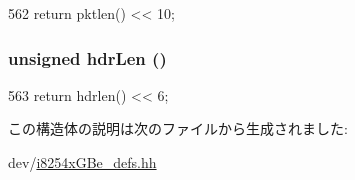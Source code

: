 \begin{DoxyCode}
562 { return pktlen() << 10; }
\end{DoxyCode}
\hypertarget{structiGbReg_1_1Regs_1_1SRRCTL_ae045a09118af243b7abba05e4d4eefbb}{
\subsubsection[{hdrLen}]{\setlength{\rightskip}{0pt plus 5cm}unsigned hdrLen ()}}
\label{structiGbReg_1_1Regs_1_1SRRCTL_ae045a09118af243b7abba05e4d4eefbb}



\begin{DoxyCode}
563 { return hdrlen() << 6; }
\end{DoxyCode}


この構造体の説明は次のファイルから生成されました:\begin{DoxyCompactItemize}
\item 
dev/\hyperlink{i8254xGBe__defs_8hh}{i8254xGBe\_\-defs.hh}\end{DoxyCompactItemize}
